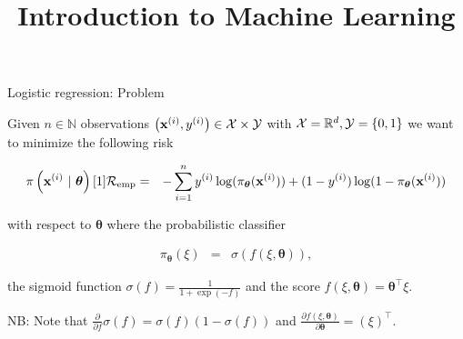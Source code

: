 \documentclass[11pt,compress,t,notes=noshow, xcolor=table]{beamer}
\title{Introduction to Machine Learning}
\institute{\href{https://compstat-lmu.github.io/lecture_i2ml/}{compstat-lmu.github.io/lecture\_i2ml}}
\date{}
\begin{document}


\begin{vbframe}{Logistic regression: Problem}

Given $n \in \mathbb{N}$ observations $\left(\mathbf{x}^{(i)}, y^{(i)}\right) \in \mathcal{X} \times \mathcal{Y}$ with  $\mathcal{X} = \mathbb{R}^d, \mathcal{Y} = \{0, 1\}$ we want to minimize the following risk 


\vspace*{-0.5cm}

\begin{eqnarray*}
\pi\left(\mathbf{x}^{(i)} ~|~ \bm{\theta}\right)[1]
  \mathcal{R}_{\text{emp}}  & = & 
  -\sum^n_{i=1} y^{(i)}\log(\pi_{\bm{\theta}}(\mathbf{x}^{(i)})) + (1-y^{(i)})\log(1-\pi_{\bm{\theta}}(\mathbf{x}^{(i)}))
\end{eqnarray*}

with respect to $\bm{\theta}$ where the probabilistic classifier

\begin{eqnarray*}
  \pi_{\bm{\theta}}(\xi)  & = & 
 \sigma(f(\xi, \bm{\theta})),
\end{eqnarray*}

the sigmoid function $\sigma(f) = \frac{1}{1 + \exp(-f)}$ and the score $f(\xi, \bm{\theta}) = \bm{\theta}^\top \xi.$

\vspace*{0.5cm} 

NB: Note that $\frac{\partial}{\partial f} \sigma(f) = \sigma(f)(1-\sigma(f))$ and $\frac{\partial f(\xi, \bm{\theta})}{\partial \bm{\theta}} = \left(\xi\right)^\top.$

\end{vbframe}
\end{document}
